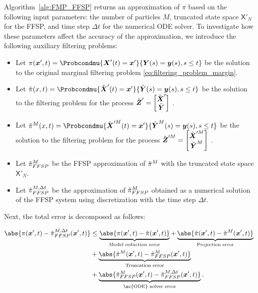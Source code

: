 Algorithm~\ref{alg:FMP_FFSP} returns an approximation of $\pi$ based on the following input parameters: the number of particles $M$, truncated state space $\mathsf{X}'_N$ for the \ac{FFSP}, and time step  $\Delta t$ for the numerical \ac{ODE} solver. To investigate how these parameters affect the accuracy of the approximation, we introduce the following auxiliary filtering problems:
\begin{itemize}
    \item Let
        $\pi (\boldsymbol{x}', t) = \Probcondmu{\boldsymbol{X}'(t) = \boldsymbol{x}'}{ \boldsymbol{Y}(s) = \boldsymbol{y}(s), s \leq t }$ be the solution to the original marginal filtering problem \eqref{eq:filtering_problem_margin}.
    \item Let
        $\Tilde{\pi} (x, t) = \Probcondmu{\Tilde{\boldsymbol{X}}'(t) = \boldsymbol{x}'}{ \Tilde{\boldsymbol{Y}}(s) = \boldsymbol{y}(s), s \leq t }$ be the solution to the filtering  problem for the process $\Tilde{\boldsymbol{Z}}' = \begin{bmatrix} \Tilde{\boldsymbol{X}}' \\  \Tilde{\boldsymbol{Y}} \end{bmatrix}$ .
    \item Let
        $\Tilde{\pi}^{M} (x,t) =  \Probcondmu{\Tilde{\boldsymbol{X}}'^M(t) = \boldsymbol{x}'}{ \Tilde{\boldsymbol{Y}}^M(s) = \boldsymbol{y}(s), s \leq t }$ be the solution to the filtering  problem for the process $\Tilde{\boldsymbol{Z}}'^M = \begin{bmatrix} \Tilde{\boldsymbol{X}}'^M \\  \Tilde{\boldsymbol{Y}}^M \end{bmatrix}$ .
        \item Let 
        $\Tilde{\pi}^{M}_{FFSP} $ be the \ac{FFSP} approximation of $\Tilde{\pi}^{M}$ with the truncated state space $\mathsf{X}'_{N}$.
    \item Let 
        $\Tilde{\pi}^{M, \Delta t}_{FFSP} $ be the approximation of $\Tilde{\pi}^{M}_{FFSP}$ obtained as a numerical solution of the \ac{FFSP} system using discretization with the time step $\Delta t$.
\end{itemize}

Next, the total error is decomposed as follows:

\begin{align*}
    \abs{ \pi(\boldsymbol{x}',t) - \Tilde{\pi}^{M, \Delta t}_{FFSP}(\boldsymbol{x}',t)} &\leq \underbrace{\abs{\pi(\boldsymbol{x}',t) - \Tilde{\pi}(\boldsymbol{x}',t)}}_{\text{Model reduction error}} 
    + \underbrace{\abs{\Tilde{\pi}(\boldsymbol{x}',t) - \Tilde{\pi}^{M} (\boldsymbol{x}', t)}}_{\text{Projection error}} \\
    &+ \underbrace{\abs{\Tilde{\pi}^{M} (\boldsymbol{x}',t) - \Tilde{\pi}^{M}_{FFSP} (\boldsymbol{x}',t)}}_{\text{Truncation error}} \\
    &+ \underbrace{\abs{ \Tilde{\pi}^{M}_{FFSP} (\boldsymbol{x}',t) - \Tilde{\pi}^{M, \Delta t}_{FFSP} (\boldsymbol{x}',t)}}_{\text{\ac{ODE} solver error}} .
\end{align*}

